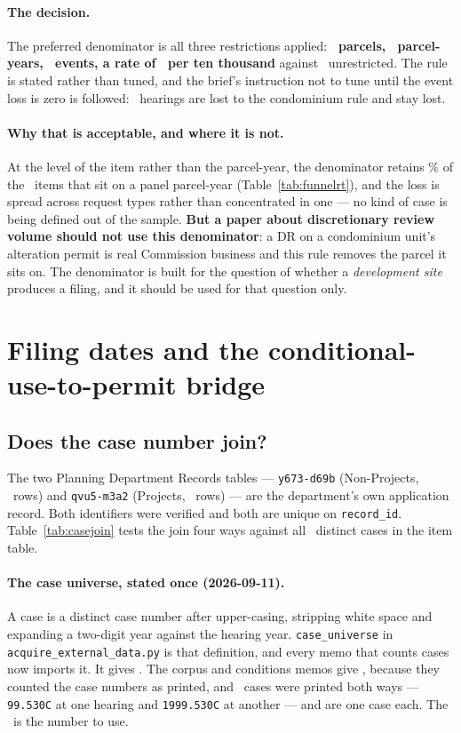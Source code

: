 \documentclass[11pt]{article}
\begin{document}
\paragraph{The decision.} The preferred denominator is all three restrictions applied:
\textbf{\acqRiskParcels\ parcels, \acqRiskParcelYears\ parcel-years, \acqRiskEvents\ events, a
rate of \acqRiskRate\ per ten thousand} against \acqRiskRateStart\ unrestricted. The rule is
stated rather than tuned, and the brief's instruction not to tune until the event loss is zero
is followed: \acqRiskCondoLost\ hearings are lost to the condominium rule and stay lost.

\paragraph{Why that is acceptable, and where it is not.} At the level of the item rather than
the parcel-year, the denominator retains \acqRiskItemsKeptPct\% of the
\acqRiskItemsPanel\ items that sit on a panel parcel-year (Table~\ref{tab:funnelrt}), and the
loss is spread across request types rather than concentrated in one --- no kind of case is
being defined out of the sample. \textbf{But a paper about discretionary review volume should
not use this denominator}: a DR on a condominium unit's alteration permit is real Commission
business and this rule removes the parcel it sits on. The denominator is built for the
question of whether a \emph{development site} produces a filing, and it should be used for
that question only.

\section{Filing dates and the conditional-use-to-permit bridge}
\label{sec:filing}

\subsection{Does the case number join?}

The two Planning Department Records tables --- \texttt{y673-d69b} (Non-Projects,
\acqNonProjRows\ rows) and \texttt{qvu5-m3a2} (Projects, \acqProjRows\ rows) --- are the
department's own
application record. Both identifiers were verified and both are unique on
\texttt{record\_id}. Table~\ref{tab:casejoin} tests the join four ways against all
\acqCases\ distinct cases in the item table.

\paragraph{The case universe, stated once (2026-09-11).} A case is a distinct case number
after upper-casing, stripping white space and expanding a two-digit year against the hearing
year. \texttt{case\_universe} in \texttt{acquire\_external\_data.py} is that definition, and
every memo that counts cases now imports it. It gives \acqCases. The corpus and conditions
memos give \acqCasesPrinted, because they counted the case numbers as printed, and
\acqCaseMerges\ cases were printed both ways --- \texttt{99.530C} at one hearing and
\texttt{1999.530C} at another --- and are one case each. The \acqCases\ is the number to use.
\end{document}
